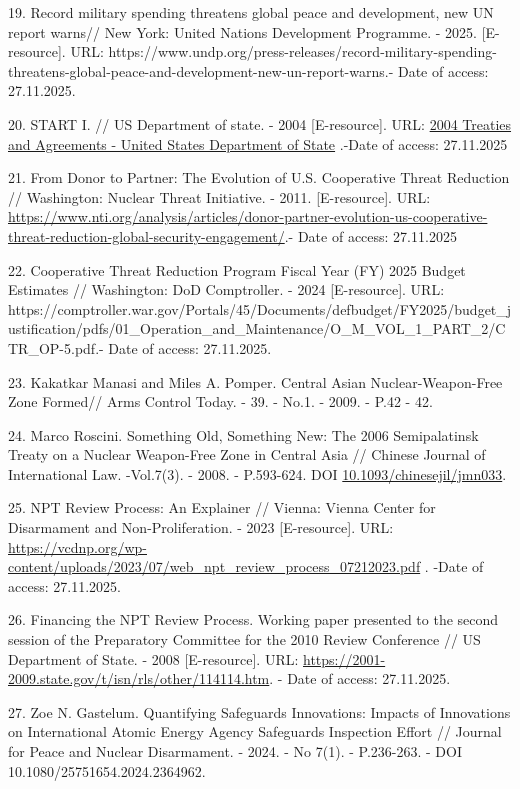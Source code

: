 \begin{refs}
19. Record military spending threatens global peace and development, new
UN report warns// New York: United Nations Development Programme. -
2025. {[}E-resource{]}. URL:
https://www.undp.org/press-releases/record-military-spending-threatens-global-peace-and-development-new-un-report-warns.- Date of access: 27.11.2025.

20. START I. // US Department of state. - 2004 {[}E-resource{]}. URL:
\href{https://www.state.gov/2004-TIAS/}{2004 Treaties and Agreements -
United States Department of State} .-Date of access: 27.11.2025

21. From Donor to Partner: The Evolution of U.S. Cooperative Threat
Reduction // Washington: Nuclear Threat Initiative. - 2011.
{[}E-resource{]}. URL:
\url{https://www.nti.org/analysis/articles/donor-partner-evolution-us-cooperative-threat-reduction-global-security-engagement/}.-
Date of access: 27.11.2025

22. Cooperative Threat Reduction Program Fiscal Year (FY) 2025 Budget
Estimates // Washington: DoD Comptroller. - 2024 {[}E-resource{]}. URL:
https://comptroller.war.gov/Portals/45/Documents/defbudget/FY2025/budget\_justification/pdfs/01\_Operation\_and\_Maintenance/O\_M\_VOL\_1\_PART\_2/CTR\_OP-5.pdf.-
Date of access: 27.11.2025.

23. Kakatkar Manasi and Miles A. Pomper. Central Asian
Nuclear-Weapon-Free Zone Formed// Arms Control Today. - 39. - No.1. -
2009. - P.42 - 42.

24. Marco Roscini. Something Old, Something New: The 2006 Semipalatinsk
Treaty on a Nuclear Weapon-Free Zone in Central Asia // Chinese Journal
of International Law. -Vol.7(3). - 2008. - P.593-624. DOI
\href{https://doi.org/10.1093/chinesejil/jmn033}{10.1093/chinesejil/jmn033}.

25. NPT Review Process: An Explainer // Vienna: Vienna Center for
Disarmament and Non-Proliferation. - 2023 {[}E-resource{]}. URL:
\url{https://vcdnp.org/wp-content/uploads/2023/07/web_npt_review_process_07212023.pdf}
. -Date of access: 27.11.2025.

26. Financing the NPT Review Process. Working paper presented to the
second session of the Preparatory Committee for the 2010 Review
Conference // US Department of State. - 2008 {[}E-resource{]}. URL:
\url{https://2001-2009.state.gov/t/isn/rls/other/114114.htm}. - Date of
access: 27.11.2025.

27. Zoe N. Gastelum. Quantifying Safeguards Innovations: Impacts of
Innovations on International Atomic Energy Agency Safeguards Inspection
Effort // Journal for Peace and Nuclear Disarmament. - 2024. - No 7(1).
- P.236-263. - DOI 10.1080/25751654.2024.2364962.


\end{refs}

